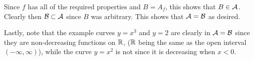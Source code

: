 {{    Since $f$ has all of the required properties and $B = A_f$, this shows that $B \in \mathcal{A}$.
    Clearly then $\mathcal{B} \subset \mathcal{A}$ since $B$ was arbitrary.
    This shows that $\mathcal{A} = \mathcal{B}$ as desired.
  }

  Lastly, note that the example curves $y = x^3$ and $y=2$ are clearly in $\mathcal{A} = \mathcal{B}$ since they are non-decreasing functions on ${\mathbb{R}}$, (${\mathbb{R}}$ being the same as the open interval $(-\infty, \infty)$), while the curve $y = x^2$ is not since it is decreasing when $x < 0$.
}
